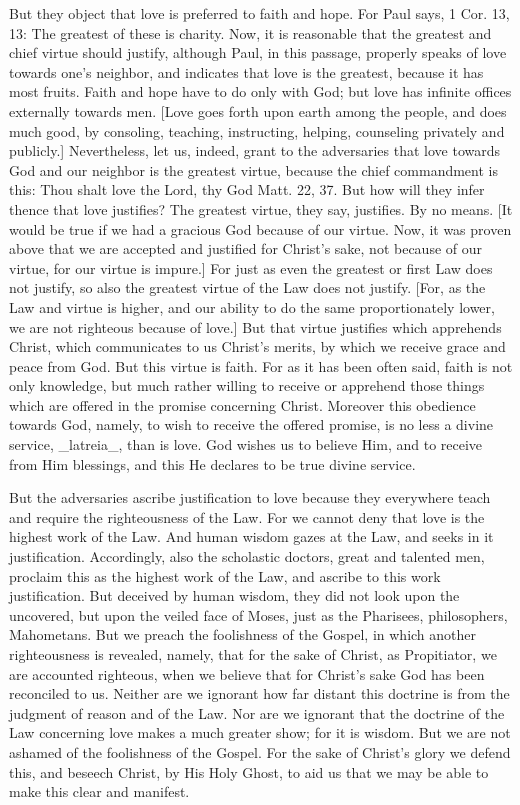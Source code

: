But they object that love is preferred to faith and hope.  For Paul
says, 1 Cor. 13, 13: The greatest of these is charity.  Now, it is
reasonable that the greatest and chief virtue should justify,
although Paul, in this passage, properly speaks of love towards one's
neighbor, and indicates that love is the greatest, because it has
most fruits.  Faith and hope have to do only with God; but love has
infinite offices externally towards men.  [Love goes forth upon earth
among the people, and does much good, by consoling, teaching,
instructing, helping, counseling privately and publicly.]
Nevertheless, let us, indeed, grant to the adversaries that love
towards God and our neighbor is the greatest virtue, because the
chief commandment is this: Thou shalt love the Lord, thy God Matt. 22,
37. But how will they infer thence that love justifies?  The
greatest virtue, they say, justifies.  By no means.  [It would be
true if we had a gracious God because of our virtue.  Now, it was
proven above that we are accepted and justified for Christ's sake,
not because of our virtue, for our virtue is impure.] For just as
even the greatest or first Law does not justify, so also the greatest
virtue of the Law does not justify.  [For, as the Law and virtue is
higher, and our ability to do the same proportionately lower, we are
not righteous because of love.] But that virtue justifies which
apprehends Christ, which communicates to us Christ's merits, by which
we receive grace and peace from God.  But this virtue is faith.  For
as it has been often said, faith is not only knowledge, but much
rather willing to receive or apprehend those things which are offered
in the promise concerning Christ.  Moreover this obedience towards
God, namely, to wish to receive the offered promise, is no less a
divine service, _latreia_, than is love.  God wishes us to believe
Him, and to receive from Him blessings, and this He declares to be
true divine service.

But the adversaries ascribe justification to love because they
everywhere teach and require the righteousness of the Law.  For we
cannot deny that love is the highest work of the Law.  And human
wisdom gazes at the Law, and seeks in it justification.  Accordingly,
also the scholastic doctors, great and talented men, proclaim this as
the highest work of the Law, and ascribe to this work justification.
But deceived by human wisdom, they did not look upon the uncovered,
but upon the veiled face of Moses, just as the Pharisees,
philosophers, Mahometans.  But we preach the foolishness of the
Gospel, in which another righteousness is revealed, namely, that for
the sake of Christ, as Propitiator, we are accounted righteous, when
we believe that for Christ's sake God has been reconciled to us.
Neither are we ignorant how far distant this doctrine is from the
judgment of reason and of the Law.  Nor are we ignorant that the
doctrine of the Law concerning love makes a much greater show; for it
is wisdom.  But we are not ashamed of the foolishness of the Gospel.
For the sake of Christ's glory we defend this, and beseech Christ, by
His Holy Ghost, to aid us that we may be able to make this clear and
manifest.

